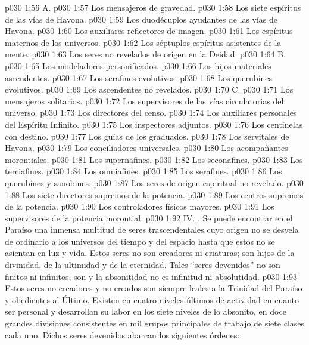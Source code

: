 \vs p030 1:56 \pc A. 
\vs p030 1:57 Los mensajeros de gravedad.
\vs p030 1:58 Los siete espíritus de las vías de Havona.
\vs p030 1:59 Los duodécuplos ayudantes de las vías de Havona.
\vs p030 1:60 Los auxiliares reflectores de imagen.
\vs p030 1:61 Los espíritus maternos de los universos.
\vs p030 1:62 Los séptuplos espíritus asistentes de la mente.
\vs p030 1:63 Los seres no revelados de origen en la Deidad.
\vs p030 1:64 \pc B. 
\vs p030 1:65 Los modeladores personificados.
\vs p030 1:66 Los hijos materiales ascendentes.
\vs p030 1:67 Los serafines evolutivos.
\vs p030 1:68 Los querubines evolutivos.
\vs p030 1:69 Los ascendentes no revelados.
\vs p030 1:70 \pc C. 
\vs p030 1:71 Los mensajeros solitarios.
\vs p030 1:72 Los supervisores de las vías circulatorias del universo.
\vs p030 1:73 Los directores del censo.
\vs p030 1:74 Los auxiliares personales del Espíritu Infinito.
\vs p030 1:75 Los inspectores adjuntos.
\vs p030 1:76 Los centinelas con destino.
\vs p030 1:77 Los guías de los graduados.
\vs p030 1:78 Los servitales de Havona.
\vs p030 1:79 Los conciliadores universales.
\vs p030 1:80 Los acompañantes morontiales.
\vs p030 1:81 Los supernafines.
\vs p030 1:82 Los seconafines.
\vs p030 1:83 Los terciafines.
\vs p030 1:84 Los omniafines.
\vs p030 1:85 Los serafines.
\vs p030 1:86 Los querubines y sanobines.
\vs p030 1:87 Los seres de origen espiritual no revelado.
\vs p030 1:88 Los siete directores supremos de la potencia.
\vs p030 1:89 Los centros supremos de la potencia.
\vs p030 1:90 Los controladores físicos mayores.
\vs p030 1:91 Los supervisores de la potencia morontial.
\vs p030 1:92 \pc IV. . Se puede encontrar en el Paraíso una inmensa multitud de seres trascendentales cuyo origen no se desvela de ordinario a los universos del tiempo y del espacio hasta que estos no se asientan en luz y vida. Estos seres no son creadores ni criaturas; son hijos  de la divinidad, de la ultimidad y de la eternidad. Tales “seres devenidos” no son finitos ni infinitos, son  y la absonitidad no es infinitud ni absolutidad.
\vs p030 1:93 Estos seres no creadores y no creados son siempre leales a la Trinidad del Paraíso y obedientes al Último. Existen en cuatro niveles últimos de actividad en cuanto ser personal y desarrollan su labor en los siete niveles de lo absonito, en doce grandes divisiones consistentes en mil grupos principales de trabajo de siete clases cada uno. Dichos seres devenidos abarcan los siguientes órdenes:
